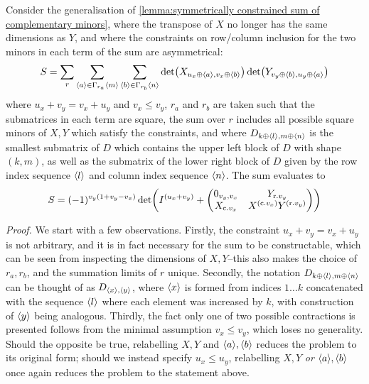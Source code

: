 	\begin{lemma}\label{lemma:asymmetrically constrained sum of complementary minors}
	Consider the generalisation of \ref{lemma:symmetrically constrained sum of complementary minors}, where the transpose of $X$ no longer has the same dimensions as $Y$, and where the constraints on row/column inclusion for the two minors in each term of the sum are asymmetrical:
	\begin{equation}
	S=\sum_{r}\sum_{\langle a\rangle\in\Gamma_{r_a}\langle m\rangle}\sum_{\langle b\rangle\in\Gamma_{r_b}\langle n\rangle}\det(X_{u_x\oplus\langle a\rangle,v_x\oplus\langle b\rangle})\det(Y_{v_y\oplus\langle b\rangle,u_y\oplus\langle a\rangle})
	\end{equation}
	where $u_x+v_y=v_x+u_y$ and $v_x\leq v_y$, $r_a$ and $r_b$ are taken such that the submatrices in each term are square, the sum over $r$ includes all possible square minors of $X,Y$ which satisfy the constraints, and where $D_{k\oplus\langle l\rangle,m\oplus\langle n\rangle}$ is the smallest submatrix of $D$ which contains the upper left block of $D$ with shape $(k,m)$, as well as the submatrix of the lower right block of $D$ given by the row index sequence $\langle l\rangle$ and column index sequence $\langle n\rangle$. The sum evaluates to
	\begin{equation}
	S=(-1)^{v_y(1+v_y-v_x)}\det(I^{(u_x+v_y)}+\mqty(
		0_{v_y,v_x} & Y_{\text{r.} v_y}\\
		X_{\text{c.} v_x} & X^{(\text{c.} v_x)} Y^{(\text{r.} v_y)}
	))
	\end{equation}
	\end{lemma}
	\textit{Proof.} We start with a few observations. Firstly, the constraint $u_x+v_y=v_x+u_y$ is not arbitrary, and it is in fact necessary for the sum to be constructable, which can be seen from inspecting the dimensions of $X,Y$--this also makes the choice of $r_a,r_b$, and the summation limits of $r$ unique. Secondly, the notation $D_{k\oplus\langle l\rangle,m\oplus\langle n\rangle}$ can be thought of as $D_{\langle x\rangle,\langle y\rangle}$, where $\langle x\rangle$ is formed from indices $1\dots k$ concatenated with the sequence $\langle l\rangle$ where each element was increased by $k$, with construction of $\langle y\rangle$ being analogous. Thirdly, the fact only one of two possible contractions is presented follows from the minimal assumption $v_x\leq v_y$, which loses no generality. Should the opposite be true, relabelling $X,Y$ and $\langle a\rangle,\langle b\rangle$ reduces the problem to its original form; should we instead specify $u_x\leq u_y$, relabelling $X,Y$ \textit{or} $\langle a\rangle,\langle b\rangle$ once again reduces the problem to the statement above.
	
